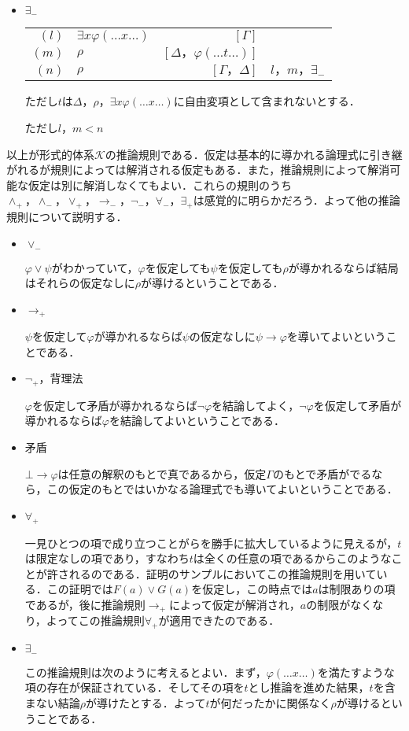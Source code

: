 \documentclass[10pt,b5paper,papersize,dvipdfmx]{jsbook}
\begin{document}
\begin{itemize}
\begin{itemize}
\item $\exists_-$
\begin{table}[H]
\begin{center}
\begin{tabular}{rlrl}
$(l)$&$\exists x\varphi(\dots x \dots)$&$[\Gamma]$& \\
$(m)$&$\rho$&$[\Delta，\varphi(\dots t \dots)]$& \\
$(n)$&$\rho$&$[\Gamma，\Delta]$&$l，m，\exists_-$
\end{tabular}
\end{center}
\end{table}
ただし$t$は$\Delta，\rho，\exists x\varphi(\dots x \dots)$に自由変項として含まれないとする． \par
ただし$l，m<n$
\end{itemize}
\end{itemize}
以上が形式的体系$\mathcal K$の推論規則である．仮定は基本的に導かれる論理式に引き継がれるが規則によっては解消される仮定もある．また，推論規則によって解消可能な仮定は別に解消しなくてもよい．これらの規則のうち$\land_+， \land_-， \lor_+， \to_-， \lnot_-， \forall_-， \exists_+$は感覚的に明らかだろう．よって他の推論規則について説明する．
\begin{itemize}
\item $\lor_-$ \par
$\varphi \lor \psi$がわかっていて，$\varphi$を仮定しても$\psi$を仮定しても$\rho$が導かれるならば結局はそれらの仮定なしに$\rho$が導けるということである．
\item $\to_+$ \par
$\psi$を仮定して$\varphi$が導かれるならば$\psi$の仮定なしに$\psi \to \varphi$を導いてよいということである．
\item $\lnot_+$，背理法 \par
$\varphi$を仮定して矛盾が導かれるならば$\lnot \varphi$を結論してよく，$\lnot \varphi$を仮定して矛盾が導かれるならば$\varphi$を結論してよいということである．
\item 矛盾 \par
$\bot \to \varphi$は任意の解釈のもとで真であるから，仮定$\Gamma$のもとで矛盾がでるなら，この仮定のもとではいかなる論理式でも導いてよいということである．
\item $\forall_+$ \par
一見ひとつの項で成り立つことがらを勝手に拡大しているように見えるが，$t$は限定なしの項であり，すなわち$t$は全くの任意の項であるからこのようなことが許されるのである．証明のサンプルにおいてこの推論規則を用いている．この証明では$F(a)\lor G(a)$を仮定し，この時点では$a$は制限ありの項であるが，後に推論規則$\to_+$によって仮定が解消され，$a$の制限がなくなり，よってこの推論規則$\forall_+$が適用できたのである．
\item $\exists_-$ \par
この推論規則は次のように考えるとよい．まず，$\varphi(\dots x \dots)$を満たすような項の存在が保証されている．そしてその項を$t$とし推論を進めた結果，$t$を含まない結論$\rho$が導けたとする．よって$t$が何だったかに関係なく$\rho$が導けるということである．
\end{itemize}
\end{document}

